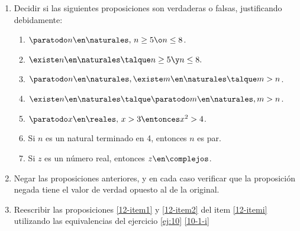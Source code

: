 \begin{enunciado}{\ejercicio}
  \begin{enumerate}[label=\roman*)]
          \item\label{12-itemi}
          Decidir si las siguientes proposiciones son verdaderas o falsas, justificando debidamente:
          \begin{multicols}{2}
            \begin{enumerate}[label=\alph*)]
              \item $\paratodo n \en \naturales,\, n \geq 5 \o n \leq 8$.
              \item $\existe n \en \naturales \talque n \geq 5 \y n\leq 8.$
              \item $\paratodo n \en \naturales, \existe m \en \naturales \talque m > n$.
              \item $\existe n \en \naturales \talque \paratodo m \en \naturales, m >n$.
              \item\label{12-item1} $\paratodo x \en \reales,\, x > 3 \entonces x^2 > 4$.
              \item\label{12-item2} Si $n$ es un natural terminado en 4, entonces $n$ es par.
              \item Si $z$ es un número real, entonces $z \en \complejos$.
            \end{enumerate}
          \end{multicols}

  \item Negar las proposiciones anteriores, y en cada caso verificar que la proposición negada tiene el valor de verdad
          opuesto al de la original.

  \item Reescribir las proposiciones \ref{12-item1} y \ref{12-item2} del item \ref{12-itemi} utilizando las equivalencias del ejercicio
          \ref{ej:10} \ref{10-1-i}
  \end{enumerate}
\end{enunciado}

